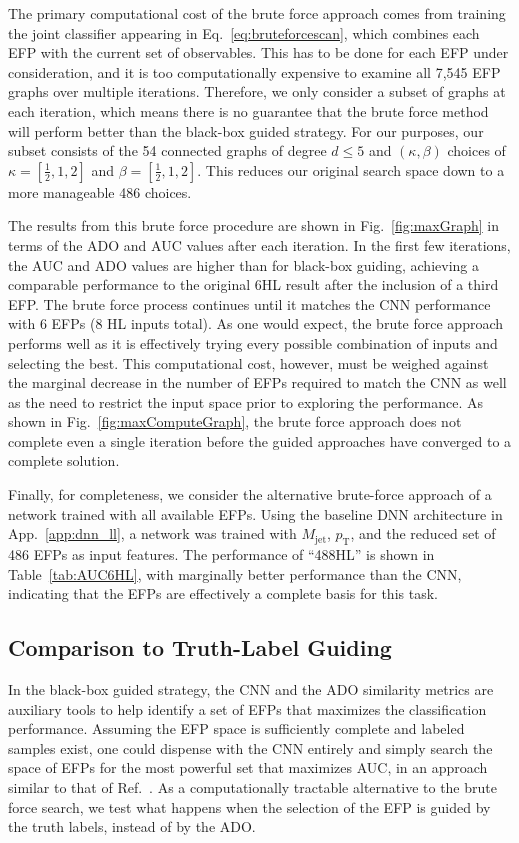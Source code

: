 \documentclass[aps,prd,twocolumn,superscriptaddress,preprintnumbers,nofootinbib,longbibliography,floatfix]{revtex4-1}
\newcommand{\rref}[1]{Ref.~\cite{#1}}
\newcommand{\Fig}[1]{Fig.~\ref{#1}}
\newcommand{\Tab}[1]{Table~\ref{#1}}
\newcommand{\App}[1]{App.~\ref{#1}}
\newcommand{\Eq}[1]{Eq.~\eqref{#1}}
\begin{document}
The primary computational cost of the brute force approach comes from training the joint classifier appearing in \Eq{eq:bruteforcescan}, which combines each EFP with the current set of observables. This has to be done for each EFP under consideration, and it is too computationally expensive to examine all 7,545 EFP graphs over multiple iterations. Therefore, we only consider a subset of graphs at each iteration, which means there is no guarantee that the brute force method will perform better than the black-box guided strategy. For our purposes, our subset consists of the 54 connected graphs of degree $d\leq 5$ and $(\kappa, \beta)$ choices of $\kappa=[\frac{1}{2}, 1, 2]$ and $\beta=[\frac{1}{2}, 1, 2]$. This reduces our original search space down to a more manageable 486 choices.

The results from this brute force procedure are shown in  \Fig{fig:maxGraph} in terms of the ADO and AUC values after each iteration. In the first few iterations, the AUC and ADO values are higher than for black-box guiding, achieving a comparable performance to the original 6HL result after the inclusion of a third EFP. The brute force process continues until it matches the CNN performance with 6 EFPs (8 HL inputs total). As one would expect, the brute force approach performs well as it is effectively trying every possible combination of inputs and selecting the best. This computational cost, however, must be weighed against the marginal decrease in the number of EFPs required to match the CNN as well as the need to restrict the input space prior to exploring the performance. As shown in \Fig{fig:maxComputeGraph}, the brute force approach does not complete even a single iteration before the guided approaches have converged to a complete solution. 

Finally, for completeness, we consider the alternative brute-force approach of a network trained with all available EFPs. Using the baseline DNN architecture in \App{app:dnn_ll}, a network was trained with $M_{\textrm{jet}}$, $p_\textrm{T}$, and the reduced set of 486 EFPs as input features.  The performance of ``488HL'' is shown in \Tab{tab:AUC6HL}, with marginally better performance than the CNN, indicating that the EFPs are effectively a complete basis for this task.

\subsection{Comparison to Truth-Label Guiding}
\label{subsec:iteratively_truthlabels}
In the black-box guided strategy, the CNN and the ADO similarity metrics are auxiliary tools to help identify a set of EFPs that maximizes the classification performance. Assuming the EFP space is sufficiently complete and labeled samples exist, one could dispense with the CNN entirely and simply search the space of EFPs for the most powerful set that maximizes AUC, in an approach similar to that of \rref{Datta:2017lxt}.  As a computationally tractable alternative to the brute force search, we test what happens when the selection of the EFP is guided by the truth labels, instead of by the ADO.
\end{document}
